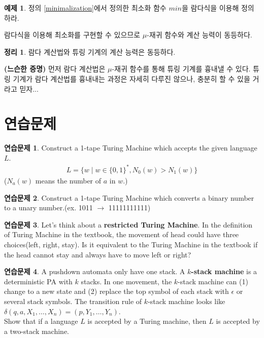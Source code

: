 \documentclass[b5paper, 11pt]{book}
\theoremstyle{definition}
\newtheorem{thm}[defn]{정리}
\newtheorem{ex}[defn]{예제}
\newtheorem{ec}{연습문제}[chapter]
\newenvironment{pf*}{\pushQED{\qed}\pf}
{\popQED\endpf}
\begin{document}
\begin{ex}
    정의 \ref{minimalization}에서 정의한 최소화 함수 $min$을 람다식을 이용해 정의하라.
\end{ex}
람다식을 이용해 최소화를 구현할 수 있으므로 $\mu$-재귀 함수와 계산 능력이 동등하다. 
\begin{thm}
    람다 계산법와 튜링 기계의 계산 능력은 동등하다.
\end{thm}
\begin{pf*}
    \textbf{(느슨한 증명)}
    먼저 람다 계산법은 $\mu$-재귀 함수를 통해 튜링 기계를 흉내낼 수 있다. 튜링 기계가 람다 계산법를 흉내내는 과정은 자세히 다루진 않으나, 충분히 할 수 있을 거라고 믿자...
\end{pf*}
\section{연습문제}
\begin{ec}
    Construct a 1-tape Turing Machine which accepts the given language $L$.
    \begin{align*}
        L = \{w \;\vert\; w \in \{0,1\}^*, N_0(w) > N_1(w) \}
    \end{align*}
    ($N_a(w)$ means the number of $a$ in $w$.)
\end{ec}
\begin{ec}
    Construct a 1-tape Turing Machine which converts a binary number to 
    a unary number.(ex. 1011 $\rightarrow$ 11111111111)
\end{ec}
\begin{ec}
    Let's think about a \textbf{restricted Turing Machine}. 
    In the definition of Turing Machine in the textbook, 
    the movement of head could have three choices(left, right, stay). 
    Is it equivalent to the Turing Machine in the textbook if the head 
    cannot stay and always have to move left or right?
\end{ec}
\begin{ec}
    A pushdown automata only have one stack. A \textbf{$k$-stack machine} is 
    a deterministic PA with $k$ stacks. In one movement, the $k$-stack machine 
    can (1) change to a new state and (2) replace the top symbol of each stack
     with $\epsilon$ or several stack symbols. The transition rule of $k$-stack
      machine looks like $\delta(q, a, X_1, \ldots, X_n) = (p, Y_1, \ldots, Y_n)$.
    \\
    Show that if a language $L$ is accepted by a Turing machine, then $L$ is
     accepted by a two-stack machine.
\end{ec}
\end{document}
